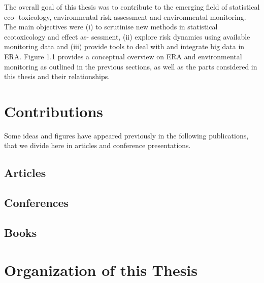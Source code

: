 The overall goal of this thesis was to contribute to the emerging field of statistical eco-
toxicology, environmental risk assessment and environmental monitoring. The main
objectives were (i) to scrutinise new methods in statistical ecotoxicology and effect as-
sessment, (ii) explore risk dynamics using available monitoring data and (iii) provide
tools to deal with and integrate big data in ERA. Figure 1.1 provides a conceptual
overview on ERA and environmental monitoring as outlined in the previous sections,
as well as the parts considered in this thesis and their relationships.

\section{Contributions}
Some ideas and figures have appeared previously in the following publications, that we divide here in articles and conference presentations. 


\begin{refsection}[ownpubs]
	\small
	\nocite{*} %
	\newrefcontext[sorting=ydnt]
	\subsection{Articles}
	\printbibliography[env=nolabelbib,heading=none,keyword=own, title={Articles}, type=article]
	\subsection{Conferences}
	\printbibliography[env=nolabelbib,heading=none,keyword=own, title={Conferences}, type=inproceedings]
	\subsection{Books}
	\printbibliography[env=nolabelbib,heading=none,keyword=own, title={Books}, type=inbook]
\end{refsection}

\section{Organization of this Thesis}

